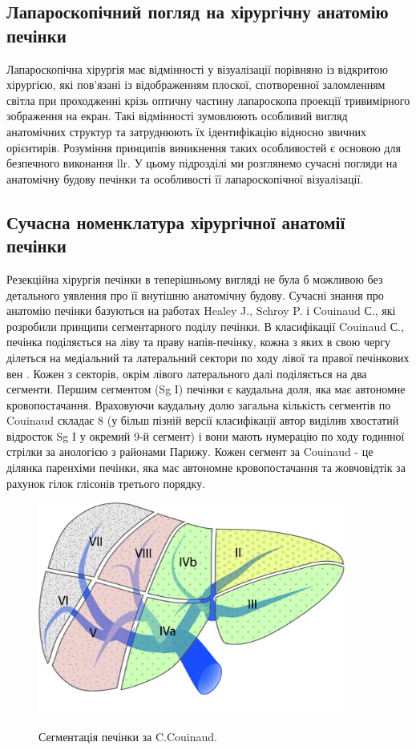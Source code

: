\begin{refsection}
\section{Лапароскопічний погляд на хірургічну анатомію печінки}

Лапароскопічна хірургія має відмінності у візуалізації порівняно із відкритою хірургією, які пов'язані із відображенням плоскої, спотворенної заломленням світла при проходженні крізь оптичну частину лапароскопа проекції тривимірного зображення на екран. Такі відмінності зумовлюють особливий вигляд анатомічних структур та затруднюють їх ідентифікацію відносно звичних орієнтирів. Розуміння принципів виникнення таких особливостей є основою для безпечного виконання \acrshort{llr}. У цьому підрозділі ми розглянемо сучасні погляди на анатомічну будову печінки та особливості її лапароскопічної візуалізації.

\subsection{Сучасна номенклатура хірургічної анатомії печінки}

Резекційна хірургія печінки в теперішньому вигляді не була б можливою без детального уявлення про її внутішню анатомічну будову. Сучасні знання про анатомію печінки базуються на работах Healey J., Schroy P. і Couinaud С., які розробили принципи сегментарного поділу печінки. В класифікації Couinaud С., печінка поділяється на ліву та праву напів-печінку, кожна з яких в свою чергу ділеться на медіальний та латеральний сектори по ходу лівої та правої печінкових вен \cite{COUINAUD1954}. Кожен з секторів, окрім лівого латерального далі поділяється на два сегменти. Першим сегментом (Sg I) печінки є каудальна доля, яка має автономне кровопостачання. Враховуючи каудальну долю загальна кількість сегментів по Couinaud складає 8 (у більш пізній версії класифікації автор виділив хвостатий відросток Sg I у окремий 9-й сегмент) і вони мають нумерацію по ходу годинної стрілки за анологією з районами Парижу. Кожен сегмент за Couinaud - це ділянка паренхіми печінки, яка має автономне кровопостачання та жовчовідтік за рахунок гілок глісонів третього порядку. 

\begin{figure}[htbp]
\caption{Сегментація печінки за C.Couinaud.}

\includegraphics[width=0.9\textwidth]{Illustrations/Chapter_01/Couinaud.jpg}
\label{fig:Couinaud}


\end{figure}
\end{refsection}
